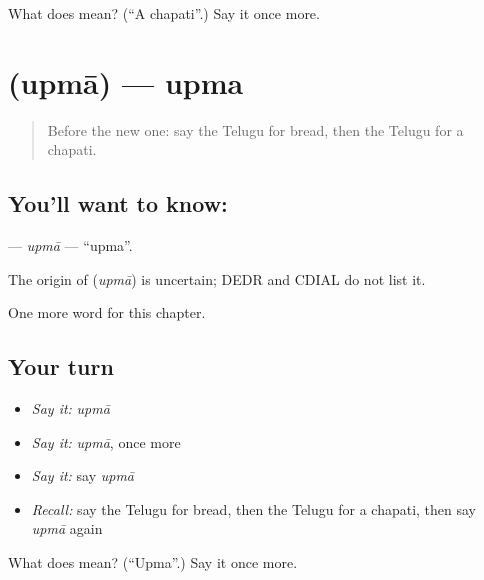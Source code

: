 \begin{tcolorbox}[breakable,colback=teal!4,colframe=teal!35!black,title={Before you move on}]
What does  mean? (\textquotedblleft{}A chapati\textquotedblright{}.) Say it once more.
\end{tcolorbox}
\section[\texorpdfstring{\te{ఉప్మా} (upmā)}{ఉప్మా (upmā)}]{ (upmā) — upma}

\label{lesson:TE-C262-upma}



\begin{quote}
Before the new one: say the Telugu for bread, then the Telugu for a chapati.
\end{quote}

\subsection*{You'll want to know: }
\textbf{} — \emph{upmā} — \textquotedblleft{}upma\textquotedblright{}.

\begin{cousinweb}
The origin of \textbf{} (\emph{upmā}) is uncertain; DEDR and CDIAL do not list it.
\end{cousinweb}

\begin{grammarlens}[title={What you've built}]
One more word for this chapter.
\end{grammarlens}

\subsection*{Your turn}
\begin{itemize}
\raggedright
  \item \emph{Say it:} \emph{upmā}
  \item \emph{Say it:} \emph{upmā}, once more
  \item \emph{Say it:} say \emph{upmā}
  \item \emph{Recall:} say the Telugu for bread, then the Telugu for a chapati, then say \emph{upmā} again
\end{itemize}

\begin{tcolorbox}[breakable,colback=teal!4,colframe=teal!35!black,title={Before you move on}]
What does  mean? (\textquotedblleft{}Upma\textquotedblright{}.) Say it once more.
\end{tcolorbox}
